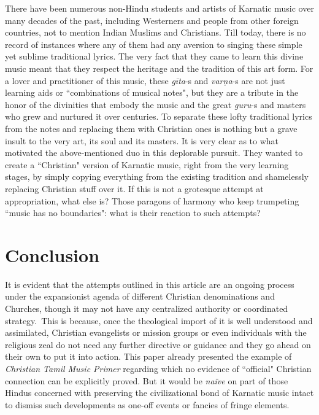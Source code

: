 There have been numerous non-Hindu students and artists of Karnatic music over many decades of the past, including Westerners and people from other foreign countries, not to mention Indian Muslims and Christians. Till today, there is no record of instances where any of them had any aversion to singing these simple yet sublime traditional lyrics. The very fact that they came to learn this divine music meant that they respect the heritage and the tradition of this art form. For a lover and practitioner of this music, these \textit{gīta}-s and \textit{varṇa}-s are not just learning aids or ``combinations of musical notes", but they are a tribute in the honor of the divinities that embody the music and the great \textit{guru}-s and masters who grew and nurtured it over centuries. To separate these lofty traditional lyrics from the notes and replacing them with Christian ones is nothing but a grave insult to the very art, its soul and its masters. It is very clear as to what motivated the above-mentioned duo in this deplorable pursuit. They wanted to create a ``Christian" version of Karnatic music, right from the very learning stages, by simply copying everything from the existing tradition and shamelessly replacing Christian stuff over it. If this is not a grotesque attempt at appropriation, what else is? Those paragons of harmony who keep trumpeting ``music has no boundaries": what is their reaction to such attempts?


\section*{Conclusion}

It is evident that the attempts outlined in this article are an ongoing process under the expansionist agenda of different Christian denominations and Churches, though it may not have any centralized authority or coordinated strategy.~This is because, once the theological import of it is well understood and assimilated, Christian evangelists or mission groups or even individuals with the religious zeal do not need any further directive or guidance and they go ahead on their own to put it into action. This paper already presented the example of \textit{Christian Tamil Music Primer} regarding which no evidence of ``official" Christian connection can be explicitly proved. But it would be \textit{naïve} on part of those Hindus concerned with preserving the civilizational bond of Karnatic music intact to dismiss such developments as one-off events or fancies of fringe elements.

